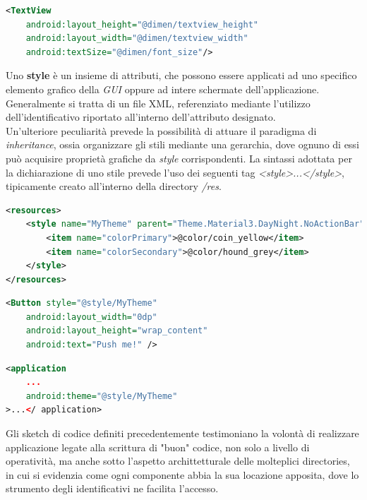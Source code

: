 \documentclass{article}
\begin{document}
\begin{center}
    \begin{lstlisting}[language=XML, title=Assegnamento delle dimen agli attributi del XMl layout]
<TextView
    android:layout_height="@dimen/textview_height"
    android:layout_width="@dimen/textview_width"
    android:textSize="@dimen/font_size"/>
    \end{lstlisting}  
\end{center}
Uno \textbf{style} è un insieme di attributi, che possono essere applicati ad uno specifico elemento grafico della \textit{GUI} oppure ad intere schermate dell'applicazione. Generalmente si tratta di un file XML, referenziato mediante l'utilizzo dell'identificativo riportato all'interno dell'attributo designato.\vspace*{7pt}\\
Un'ulteriore peculiarità prevede la possibilità di attuare il paradigma di \textit{inheritance}, ossia organizzare gli stili mediante una gerarchia, dove ognuno di essi può acquisire proprietà grafiche da \textit{style} corrispondenti. La sintassi adottata per la dichiarazione di uno stile prevede l'uso dei seguenti tag \textit{<style>...</style>}, tipicamente creato all'interno della directory \textit{/res}.
\begin{lstlisting}[language=XML, title=Dichiarazione di uno style]
<resources>
    <style name="MyTheme" parent="Theme.Material3.DayNight.NoActionBar">
        <item name="colorPrimary">@color/coin_yellow</item>
        <item name="colorSecondary">@color/hound_grey</item>
    </style>
</resources>
\end{lstlisting}  
\begin{lstlisting}[language=XML, title=Assegnamento dello stile ad un solo elemento grafico]
<Button style="@style/MyTheme"
    android:layout_width="0dp"
    android:layout_height="wrap_content"
    android:text="Push me!" />    
\end{lstlisting}  
\begin{lstlisting}[language=XML, title=Assegnamento dello stile all'intera applicazione]
<application
    ...
    android:theme="@style/MyTheme"
>...</ application>    
\end{lstlisting}  
Gli sketch di codice definiti precedentemente testimoniano la volontà di realizzare applicazione legate alla scrittura di "buon" codice, non solo a livello di operatività, ma anche sotto l'aspetto archittetturale delle molteplici directories, in cui si evidenzia come ogni componente abbia la sua locazione apposita, dove lo strumento degli identificativi ne facilita l'accesso.
\end{document}
